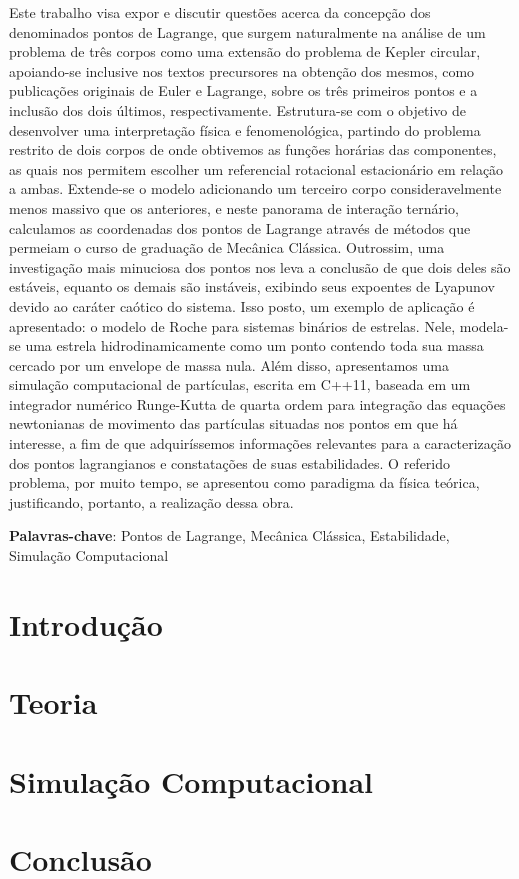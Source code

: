 \documentclass[10pt,twoside,a4paper,brazil]{abntex2}
\begin{document}
   \imprimircapa
   
   \imprimirfolhaderosto   
   
   \tableofcontents

	 \newpage
	 
   \begin{resumo}
      Este trabalho visa expor e discutir questões acerca da concepção dos denominados pontos de Lagrange, que surgem naturalmente na análise de um problema de três corpos como uma extensão do problema de Kepler circular, apoiando-se inclusive nos textos precursores na obtenção dos mesmos, como publicações originais de Euler e Lagrange, sobre os três primeiros pontos e a inclusão dos dois últimos, respectivamente. Estrutura-se com o objetivo de desenvolver uma interpretação física e fenomenológica, partindo do problema restrito de dois corpos de onde obtivemos as funções horárias das componentes, as quais nos permitem escolher um referencial rotacional estacionário em relação a ambas. Extende-se o modelo adicionando um terceiro corpo consideravelmente menos massivo que os anteriores, e neste panorama de interação ternário, calculamos as coordenadas dos pontos de Lagrange através de métodos que permeiam o curso de graduação de Mecânica Clássica. Outrossim, uma investigação mais minuciosa dos pontos nos leva a conclusão de que dois deles são estáveis, equanto os demais são instáveis, exibindo seus expoentes de Lyapunov devido ao caráter caótico do sistema. Isso posto, um exemplo de aplicação é apresentado: o modelo de Roche para sistemas binários de estrelas. Nele, modela-se uma estrela hidrodinamicamente como um ponto contendo toda sua massa cercado por um envelope de massa nula. Além disso, apresentamos uma simulação computacional de partículas, escrita em C++11, baseada em um integrador numérico Runge-Kutta de quarta ordem para integração das equações newtonianas de movimento das partículas situadas nos pontos em que há interesse, a fim de que adquiríssemos informações relevantes para a caracterização dos pontos lagrangianos e constatações de suas estabilidades. O referido problema, por muito tempo, se apresentou como paradigma da física teórica, justificando, portanto, a realização dessa obra.

      \vspace{\onelineskip}
      \noindent
      \textbf{Palavras-chave}: Pontos de Lagrange, Mecânica Clássica, Estabilidade, Simulação Computacional
   \end{resumo}

   \chapter{Introdução}
      
      
   \chapter{Teoria}
      
     
   \chapter{Simulação Computacional}
      

   \chapter{Conclusão}
      

	 \nocite{mccann}\nocite{cornish}
   
\end{document}
